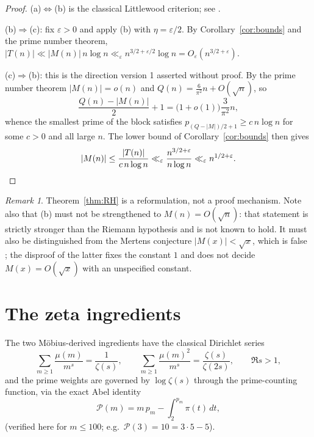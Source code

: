 \documentclass[11pt]{amsart}
\numberwithin{equation}{section}
\theoremstyle{plain}
\theoremstyle{definition}
\theoremstyle{remark}
\newtheorem{remark}[theorem]{Remark}
\newcommand{\mob}{\mu}
\newcommand{\Mert}{M}
\newcommand{\Sq}{Q}
\newcommand{\PS}{\mathcal P}
\begin{document}
\begin{proof}
(a)$\iff$(b) is the classical Littlewood criterion; see \cite{Littlewood1912,Titchmarsh1986}.

(b)$\Rightarrow$(c): fix $\varepsilon>0$ and apply (b) with
$\eta=\varepsilon/2$. By Corollary~\ref{cor:bounds} and the prime number theorem,
$|T(n)|\ll |\Mert(n)|\,n\log n\ll_{\varepsilon}
 n^{3/2+\varepsilon/2}\log n=O_{\varepsilon}(n^{3/2+\varepsilon})$.

(c)$\Rightarrow$(b): this is the direction version 1 asserted without proof. By
the prime number theorem $|\Mert(n)|=o(n)$ and $\Sq(n)=\tfrac6{\pi^2}n+O(\sqrt
n)$, so
\begin{equation}
\label{eq:smallest-block-index}
\frac{\Sq(n)-|\Mert(n)|}{2}+1=\bigl(1+o(1)\bigr)\frac{3}{\pi^2}n ,
\end{equation}
whence the smallest prime of the block satisfies
$p_{(\Sq-|\Mert|)/2+1}\ge c\,n\log n$ for some $c>0$ and all large $n$. The
lower bound of Corollary~\ref{cor:bounds} then gives
\begin{equation}
\label{eq:reverse-mertens-bound}
|\Mert(n)|\le \frac{|T(n)|}{c\,n\log n}
\ll_\varepsilon \frac{n^{3/2+\varepsilon}}{n\log n}
\ll_\varepsilon n^{1/2+\varepsilon}. \qedhere
\end{equation}
\end{proof}

\begin{remark}
\label{rem:rh-reformulation}
Theorem~\ref{thm:RH} is a reformulation, not a proof mechanism. Note also that
(b) must not be strengthened to $\Mert(n)=O(\sqrt n)$: that statement is
strictly stronger than the Riemann hypothesis and is not known to hold.  It must
also be distinguished from the Mertens conjecture $|\Mert(x)|<\sqrt x$, which is
false \cite{OdlyzkoTeRiele1985}; the disproof of the latter fixes the constant
$1$ and does not decide $\Mert(x)=O(\sqrt x)$ with an unspecified constant.
\end{remark}

\section{The zeta ingredients}
\label{sec:zeta-ingredients}

The two M\"obius-derived ingredients have the classical Dirichlet series \cite{Apostol1976}
\begin{equation}
\label{eq:dirichlet-series}
\sum_{m\ge1}\frac{\mob(m)}{m^s}=\frac1{\zeta(s)},
\qquad
\sum_{m\ge1}\frac{\mob(m)^2}{m^s}=\frac{\zeta(s)}{\zeta(2s)},
\qquad \Re s>1,
\end{equation}
and the prime weights are governed by $\log\zeta(s)$ through the prime-counting
function, via the exact Abel identity
\begin{equation}
\label{eq:abel-prime-sum}
\PS(m)=m\,p_m-\int_2^{p_m}\pi(t)\,dt ,
\end{equation}
(verified here for $m\le100$; e.g.\ $\PS(3)=10=3\cdot5-5$).
\end{document}
